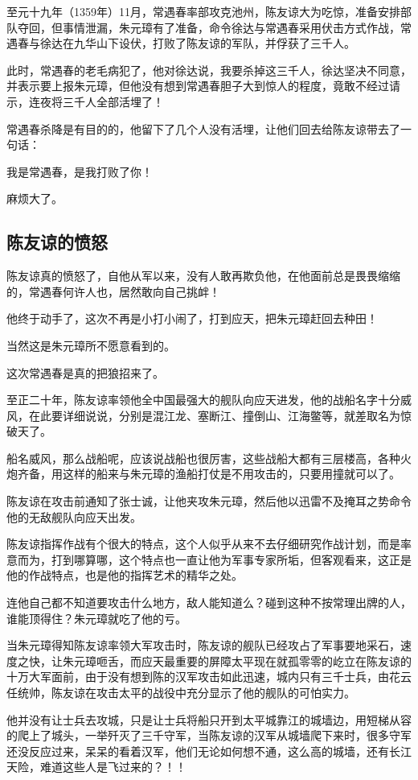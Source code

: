 \begin{multicols}{\theparacolNo}
		至元十九年（1359年）11月，常遇春率部攻克池州，陈友谅大为吃惊，准备安排部队夺回，但事情泄漏，朱元璋有了准备，命令徐达与常遇春采用伏击方式作战，常遇春与徐达在九华山下设伏，打败了陈友谅的军队，并俘获了三千人。

		此时，常遇春的老毛病犯了，他对徐达说，我要杀掉这三千人，徐达坚决不同意，并表示要上报朱元璋，但他没有想到常遇春胆子大到惊人的程度，竟敢不经过请示，连夜将三千人全部活埋了！

		常遇春杀降是有目的的，他留下了几个人没有活埋，让他们回去给陈友谅带去了一句话：

		我是常遇春，是我打败了你！

		麻烦大了。

		\subsection{陈友谅的愤怒}
		陈友谅真的愤怒了，自他从军以来，没有人敢再欺负他，在他面前总是畏畏缩缩的，常遇春何许人也，居然敢向自己挑衅！

		他终于动手了，这次不再是小打小闹了，打到应天，把朱元璋赶回去种田！

		当然这是朱元璋所不愿意看到的。

		这次常遇春是真的把狼招来了。

		至正二十年，陈友谅率领他全中国最强大的舰队向应天进发，他的战船名字十分威风，在此要详细说说，分别是混江龙、塞断江、撞倒山、江海鳖等，就差取名为惊破天了。

		船名威风，那么战船呢，应该说战船也很厉害，这些战船大都有三层楼高，各种火炮齐备，用这样的船来与朱元璋的渔船打仗是不用攻击的，只要用撞就可以了。

		陈友谅在攻击前通知了张士诚，让他夹攻朱元璋，然后他以迅雷不及掩耳之势命令他的无敌舰队向应天出发。

		陈友谅指挥作战有个很大的特点，这个人似乎从来不去仔细研究作战计划，而是率意而为，打到哪算哪，这个特点也一直让他为军事专家所垢，但客观看来，这正是他的作战特点，也是他的指挥艺术的精华之处。

		连他自己都不知道要攻击什么地方，敌人能知道么？碰到这种不按常理出牌的人，谁能顶得住？朱元璋就吃了他的亏。

		当朱元璋得知陈友谅率领大军攻击时，陈友谅的舰队已经攻占了军事要地采石，速度之快，让朱元璋咂舌，而应天最重要的屏障太平现在就孤零零的屹立在陈友谅的十万大军面前，由于没有想到陈的汉军攻击如此迅速，城内只有三千士兵，由花云任统帅，陈友谅在攻击太平的战役中充分显示了他的舰队的可怕实力。

		他并没有让士兵去攻城，只是让士兵将船只开到太平城靠江的城墙边，用短梯从容的爬上了城头，一举歼灭了三千守军，当陈友谅的汉军从城墙爬下来时，很多守军还没反应过来，呆呆的看着汉军，他们无论如何想不通，这么高的城墙，还有长江天险，难道这些人是飞过来的？！！


\end{multicols}
